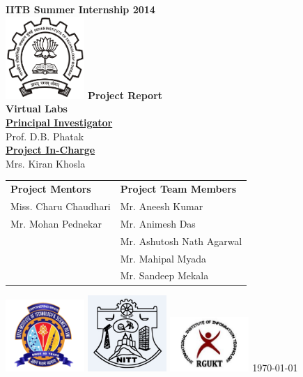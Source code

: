 \documentclass[12pt]{report}
\begin{document}
\begin{titlepage}
 \begin{center}
\Huge
\textbf{IITB Summer Internship 2014} \\
\vfill
\includegraphics[width=3cm]{IITB_logo.png}
\vfill
\Huge
\textbf{Project Report}\\
\vfill
\textbf{Virtual Labs}\\
\vfill
\LARGE
\underline{\textbf{Principal Investigator}} \\
Prof. D.B. Phatak\\
\vfill
\LARGE
\underline{\textbf{Project In-Charge}} \\
Mrs. Kiran Khosla\\
\vfill
\Large

\begin{tabular}{l|l}
\textbf{Project Mentors} & \textbf{Project Team Members} \\
Miss. Charu Chaudhari & Mr. Aneesh Kumar\\
Mr. Mohan Pednekar & Mr. Animesh Das\\ 
& Mr. Ashutosh Nath Agarwal \\
& Mr. Mahipal Myada \\
& Mr. Sandeep Mekala \\
\end{tabular}
\vfill

\includegraphics[width=3cm]{bits_logo.png} \hfill
\includegraphics[width=3cm]{nit_logo.jpg} \hfill
\includegraphics[width=3cm]{rgukt_logo.jpg} 
\vfill
\today
\end{center}
\end{titlepage}
\end{document}
